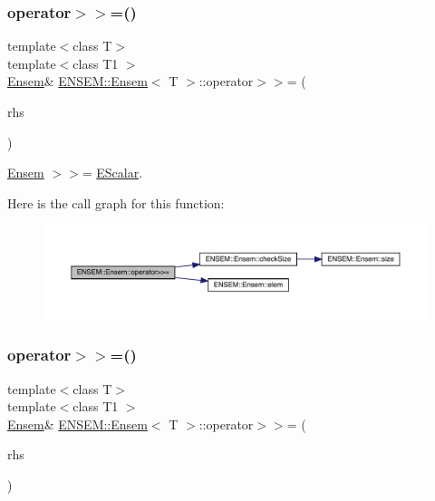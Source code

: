\subsubsection{\texorpdfstring{operator$>$$>$=()}{operator>>=()}\hspace{0.1cm}{\footnotesize\ttfamily [1/2]}}
{\footnotesize\ttfamily template$<$class T$>$ \\
template$<$class T1 $>$ \\
\mbox{\hyperlink{classENSEM_1_1Ensem}{Ensem}}\& \mbox{\hyperlink{classENSEM_1_1Ensem}{E\+N\+S\+E\+M\+::\+Ensem}}$<$ T $>$\+::operator$>$$>$= (\begin{DoxyParamCaption}\item[{const \mbox{\hyperlink{classENSEM_1_1EScalar}{E\+Scalar}}$<$ T1 $>$ \&}]{rhs }\end{DoxyParamCaption})\hspace{0.3cm}{\ttfamily [inline]}}



\mbox{\hyperlink{classENSEM_1_1Ensem}{Ensem}} $>$$>$= \mbox{\hyperlink{classENSEM_1_1EScalar}{E\+Scalar}}. 

Here is the call graph for this function\+:
\nopagebreak
\begin{figure}[H]
\begin{center}
\leavevmode
\includegraphics[width=350pt]{d7/d3e/classENSEM_1_1Ensem_a9511b1d1b45de39920d451700eecd4d9_cgraph}
\end{center}
\end{figure}
\mbox{\label{classENSEM_1_1Ensem_a9511b1d1b45de39920d451700eecd4d9}} 
\subsubsection{\texorpdfstring{operator$>$$>$=()}{operator>>=()}\hspace{0.1cm}{\footnotesize\ttfamily [2/2]}}
{\footnotesize\ttfamily template$<$class T$>$ \\
template$<$class T1 $>$ \\
\mbox{\hyperlink{classENSEM_1_1Ensem}{Ensem}}\& \mbox{\hyperlink{classENSEM_1_1Ensem}{E\+N\+S\+E\+M\+::\+Ensem}}$<$ T $>$\+::operator$>$$>$= (\begin{DoxyParamCaption}\item[{const \mbox{\hyperlink{classENSEM_1_1EScalar}{E\+Scalar}}$<$ T1 $>$ \&}]{rhs }\end{DoxyParamCaption})\hspace{0.3cm}{\ttfamily [inline]}}



